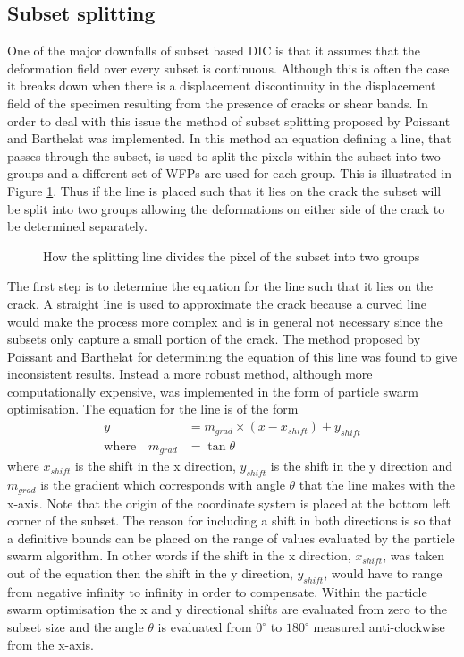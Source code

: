 \documentclass[12pt,oneside,openany,a4paper, %
english, %
masters-t, goldenblock]{usthesis}
\begin{document}
\subsection{Subset splitting}
One of the major downfalls of subset based DIC is that it assumes that the deformation field over every subset is continuous. Although this is often the case it breaks down when there is a displacement discontinuity in the displacement field of the specimen resulting from the presence of cracks or shear bands. In order to deal with this issue the method of subset splitting proposed by Poissant and Barthelat \cite{poissant2010novel} was implemented. In this method an equation defining a line, that passes through the subset, is used to split the pixels within the subset into two groups and a different set of WFPs are used for each group. This is illustrated in Figure \ref{fig: subset split}. Thus if the line is placed such that it lies on the crack the subset will be split into two groups allowing the deformations on either side of the crack to be determined separately. 

\begin{figure}[H]
    \centering
    \resizebox{0.6\linewidth}{!}{
    
    }
    \caption{How the splitting line divides the pixel of the subset into two groups}
    \label{fig: subset split}
\end{figure}


The first step is to determine the equation for the line such that it lies on the crack. A straight line is used to approximate the crack because a curved line would make the process more complex and is in general not necessary since the subsets only capture a small portion of the crack. The method proposed by Poissant and Barthelat \cite{poissant2010novel} for determining the equation of this line was found to give inconsistent results. Instead a more robust method, although more computationally expensive, was implemented in the form of particle swarm optimisation. The equation for the line is of the form 
\begin{align}
    y&=m_{grad} \times (x-x_{shift}) + y_{shift} \\
    \text{where} \quad m_{grad}&=\tan{\theta}
\end{align}
where $x_{shift}$ is the shift in the x direction, $y_{shift}$ is the shift in the y direction and $m_{grad}$ is the gradient which corresponds with angle $\theta$ that the line makes with the x-axis. Note that the origin of the coordinate system is placed at the bottom left corner of the subset. The reason for including a shift in both directions is so that a definitive bounds can be placed on the range of values evaluated by the particle swarm algorithm. In other words if the shift in the x direction, $x_{shift}$, was taken out of the equation then the shift in the y direction, $y_{shift}$, would have to range from negative infinity to infinity in order to compensate. Within the particle swarm optimisation the x and y directional shifts are evaluated from zero to the subset size and the angle $\theta$ is evaluated from $0^\circ$ to $180^\circ$ measured anti-clockwise from the x-axis. 
\end{document}

